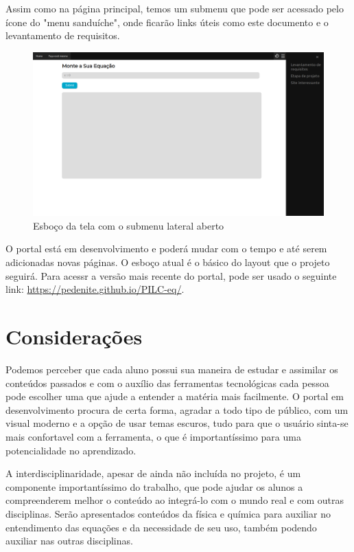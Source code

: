 \documentclass[12pt]{report}
\begin{document}
Assim como na página principal, temos um submenu que pode ser acessado pelo ícone do "menu sanduíche", onde ficarão links úteis como este documento e o levantamento de requisitos.

\begin{figure}[H]
    \includegraphics[width=1\textwidth]{img/submenu.png}
    \caption{Esboço da tela com o submenu lateral aberto}
\end{figure}

O portal está em desenvolvimento e poderá mudar com o tempo e até serem adicionadas novas páginas. O esboço atual é o básico do layout que o projeto seguirá. Para acessr a versão mais recente do portal, pode ser usado o seguinte link: \url{https://pedenite.github.io/PILC-eq/}.

\chapter{Considerações}
Podemos perceber que cada aluno possui sua maneira de estudar e assimilar os conteúdos passados e com o auxílio das ferramentas tecnológicas cada pessoa pode escolher uma que ajude a entender a matéria mais facilmente. O portal em desenvolvimento procura de certa forma, agradar a todo tipo de público, com um visual moderno e a opção de usar temas escuros, tudo para que o usuário sinta-se mais confortavel com a ferramenta, o que é importantíssimo para uma potencialidade no aprendizado.

A interdisciplinaridade, apesar de ainda não incluída no projeto, é um componente importantíssimo do trabalho, que pode ajudar os alunos a compreenderem melhor o conteúdo ao integrá-lo com o mundo real e com outras disciplinas. Serão apresentados conteúdos da física e química para auxiliar no entendimento das equações e da necessidade de seu uso, também podendo auxiliar nas outras disciplinas.
\end{document}

